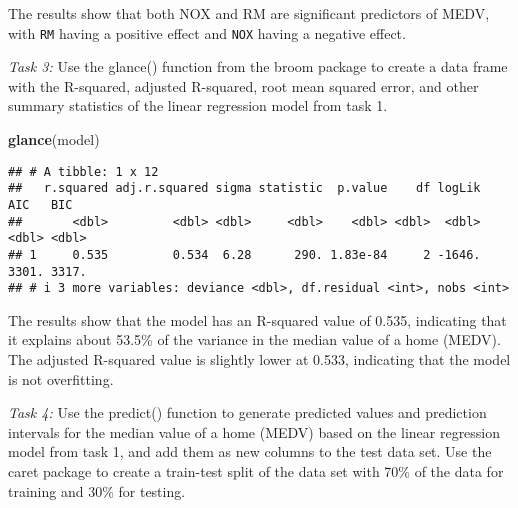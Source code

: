\documentclass[
]{book}
\newenvironment{Shaded}{\begin{snugshade}}{\end{snugshade}}
\newcommand{\AttributeTok}[1]{\textcolor[rgb]{0.13,0.29,0.53}{#1}}
\newcommand{\ConstantTok}[1]{\textcolor[rgb]{0.56,0.35,0.01}{#1}}
\newcommand{\DecValTok}[1]{\textcolor[rgb]{0.00,0.00,0.81}{#1}}
\newcommand{\FunctionTok}[1]{\textcolor[rgb]{0.13,0.29,0.53}{\textbf{#1}}}
\newcommand{\NormalTok}[1]{#1}
\newcommand{\OtherTok}[1]{\textcolor[rgb]{0.56,0.35,0.01}{#1}}
\newcommand{\SpecialCharTok}[1]{\textcolor[rgb]{0.81,0.36,0.00}{\textbf{#1}}}
\newcommand{\StringTok}[1]{\textcolor[rgb]{0.31,0.60,0.02}{#1}}
\begin{document}
The results show that both NOX and RM are significant predictors of MEDV, with \texttt{RM} having a positive effect and \texttt{NOX} having a negative effect.

\emph{Task 3:} Use the glance() function from the broom package to create a data frame with the R-squared, adjusted R-squared, root mean squared error, and other summary statistics of the linear regression model from task 1.

\begin{Shaded}
\begin{Highlighting}[]
\FunctionTok{glance}\NormalTok{(model)}
\end{Highlighting}
\end{Shaded}

\begin{verbatim}
## # A tibble: 1 x 12
##   r.squared adj.r.squared sigma statistic  p.value    df logLik   AIC   BIC
##       <dbl>         <dbl> <dbl>     <dbl>    <dbl> <dbl>  <dbl> <dbl> <dbl>
## 1     0.535         0.534  6.28      290. 1.83e-84     2 -1646. 3301. 3317.
## # i 3 more variables: deviance <dbl>, df.residual <int>, nobs <int>
\end{verbatim}

The results show that the model has an R-squared value of 0.535, indicating that it explains about 53.5\% of the variance in the median value of a home (MEDV). The adjusted R-squared value is slightly lower at 0.533, indicating that the model is not overfitting.

\emph{Task 4:} Use the predict() function to generate predicted values and prediction intervals for the median value of a home (MEDV) based on the linear regression model from task 1, and add them as new columns to the test data set. Use the caret package to create a train-test split of the data set with 70\% of the data for training and 30\% for testing.

\begin{Shaded}
\end{Shaded}
\end{document}
